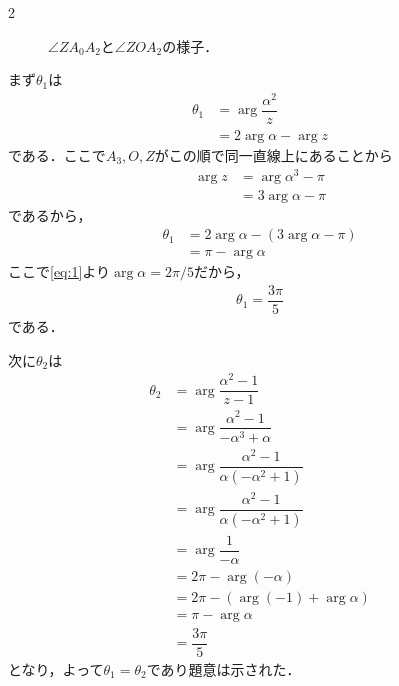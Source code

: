 \documentclass[../../main.tex]{subfiles}
\begin{document}
\begin{multicols}{2}
\begin{figure}[H]
    \caption{$\angle ZA_0A_2$と$\angle ZOA_2$の様子．}
    \label{2001-3:fig:4}
  \end{figure}

  まず$\theta_1$は
  \begin{align}
    \theta_1
    & = \arg\dfrac{\alpha^2}{z} \\
    & = 2\arg \alpha - \arg z
  \end{align}
  である．ここで$A_3,O,Z$がこの順で同一直線上にあることから
  \begin{align}
    \arg z
    & = \arg \alpha^3 - \pi \\
    & = 3\arg \alpha - \pi
  \end{align}
  であるから，
  \begin{align}
    \theta_1
    & = 2 \arg \alpha - (3\arg \alpha - \pi) \\
    & = \pi - \arg \alpha
  \end{align}
  ここで\cref{eq:1}より$\arg\alpha=2\pi/5$だから，
  \begin{align}
    \theta_1 = \dfrac{3\pi}{5}
  \end{align}
  である．

  次に$\theta_2$は
  \begin{align}
    \theta_2
    & =\arg\dfrac{\alpha^2-1}{z-1}                 \\
    & =\arg\dfrac{\alpha^2-1}{-\alpha^3+\alpha}    \\
    & =\arg\dfrac{\alpha^2-1}{\alpha(-\alpha^2+1)} \\
    & =\arg\dfrac{\alpha^2-1}{\alpha(-\alpha^2+1)} \\
    & =\arg\dfrac{1}{-\alpha}                      \\
    & =2\pi-\arg(-\alpha)                         \\
    & =2\pi-(\arg(-1)+\arg\alpha)                 \\
    & =\pi-\arg\alpha                             \\
    & = \dfrac{3\pi}{5}
  \end{align}
  となり，よって$\theta_1=\theta_2$であり題意は示された．


  \newpage
\end{multicols}
\end{document}
